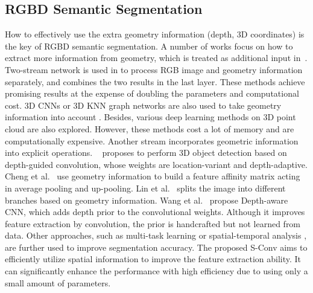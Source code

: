 \documentclass[journal]{IEEEtran}
\begin{document}
\subsection{RGBD Semantic Segmentation}
How to effectively use the extra geometry information (depth, 3D coordinates)
is the key of RGBD semantic segmentation.
A number of works focus on how to extract more information
from geometry, which is treated as additional
input in~\cite{eigen2015predicting, ma2017multi, fusenet, 
wang2016learning, hu2019acnet}.
Two-stream network is used in \cite{ma2017multi, fusenet, 
wang2016learning, lstmcf, rdfnet}
to process RGB image and geometry information separately,
and combines the two results in the last layer.
These methods achieve promising results at the expense of
doubling the parameters and computational cost.
3D CNNs or 3D KNN graph networks are also used to 
take geometry information into account
\cite{song2017semantic, song2016deep, qi20173d}.
Besides, various deep learning methods on 3D point cloud
\cite{pointnet, pointnet++, chen2019lsanet,spidercnn, spectral_graph_conv,pointcnn} 
are also explored.
However, these methods
cost a lot of memory and are computationally expensive.
Another stream incorporates geometric information into explicit operations.
~\cite{ding2020learning} proposes to perform 3D object detection based on depth-guided convolution, whose weights are location-variant and depth-adaptive.
Cheng et al.~\cite{local} use geometry information to build a feature affinity
matrix acting in average pooling and up-pooling.
Lin et al.~\cite{cascaded} splits the image into different branches based
on geometry information.
Wang et al.~\cite{dcnn} propose Depth-aware CNN, which adds
depth prior to the convolutional weights.
Although it improves feature extraction by convolution, the prior is
handcrafted but not learned from data.
Other approaches, such as multi-task learning
\cite{jiao2019geometry,wang2015towards,hoffman2016learning,
kokkinos2017ubernet,eigen2015predicting,Zhang_2019_CVPR}
or spatial-temporal analysis
\cite{he2017std2p}, are further used to improve segmentation accuracy.
The proposed S-Conv aims to efficiently utilize
spatial information to improve the feature extraction ability.
It can significantly enhance the performance with high efficiency due to using 
only a small amount of parameters.
\end{document}

